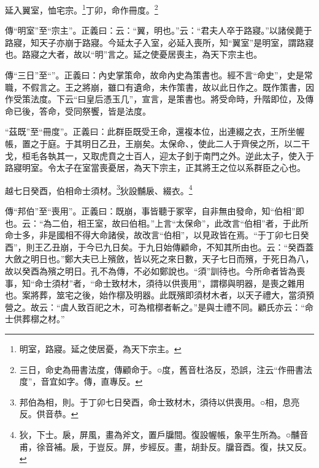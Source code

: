 延入翼室，恤宅宗。\footnote{明室，路寢。延之使居憂，為天下宗主。}丁卯，命作冊度。\footnote{三日，命史為冊書法度，傳顧命于。○度，舊音杜洛反，恐誤，注云“作冊書法度”，音宜如字。傳，直專反。}

{\noindent\zhuan{}\fzbyks 傳“明室”至“宗主”。正義曰：云：“翼，明也。”云：“君夫人卒于路寢。”以諸侯薨于路寢，知天子亦崩于路寢。今延太子入室，必延入喪所，知“翼室”是明室，謂路寢也。路寢之大者，故以“明”言之。延之使憂居喪主，為天下宗主也。 \par}

{\noindent\zhuan{}\fzbyks 傳“三日”至“”。正義曰：內史掌策命，故命內史為策書也。經不言“命史”，史是常職，不假言之。王之將崩，雖口有遺命，未作策書，故以此日作之。既作策書，因作受策法度。下云“曰皇后憑玉几”，宣言，是策書也。將受命時，升階即位，及傳命已後，答命，受同祭饗，皆是法度。 \par}

{\noindent\shu{}\fzkt “茲既”至“冊度”。正義曰：此群臣既受王命，還複本位，出連綴之衣，王所坐幄帳，置之于庭。于其明日乙丑，王崩矣。太保命、，使此二人于齊侯之所，以二干戈，桓毛各執其一，又取虎賁之士百人，迎太子釗于南門之外。逆此太子，使入于路寢明室。令太子在室當喪憂居，為天下宗主，正其將王之位以系群臣之心也。 \par}

越七日癸酉，伯相命士須材。\footnote{邦伯為相，則。于丁卯七日癸酉，命士致材木，須待以供喪用。○相，息亮反。供音恭。}狄設黼扆、綴衣。\footnote{狄，下士。扆，屏風，畫為斧文，置戶牖間。復設幄帳，象平生所為。○黼音甫，徐音補。扆，于豈反。屏，步經反。畫，胡卦反。牖音酉。復，扶又反。}


{\noindent\zhuan{}\fzbyks 傳“邦伯”至“喪用”。正義曰：既崩，事皆聽于冢宰，自非無由發命，知“伯相”即也。云：“為二伯，相王室，故曰伯相。”上言“太保命”，此改言“伯相”者，于此所命士多，非是國相不得大命諸侯，故改言“伯相”，以見政皆在焉。“于丁卯七日癸酉”，則王乙丑崩，于今已九日矣。于九日始傳顧命，不知其所由也。云：“癸酉蓋大斂之明日也。”鄭大夫已上殯斂，皆以死之來日數，天子七日而殯，于死日為八，故以癸酉為殯之明日。孔不為傳，不必如鄭說也。“須”訓待也。今所命者皆為喪事，知“命士須材”者，“命士致材木，須待以供喪用”，謂槨與明器，是喪之雜用也。案將葬，筮宅之後，始作槨及明器。此既殯即須材木者，以天子禮大，當須預營之。故云：“虞人致百祀之木，可為棺槨者斬之。”是與士禮不同。顧氏亦云：“命士供葬槨之材。” \par}


